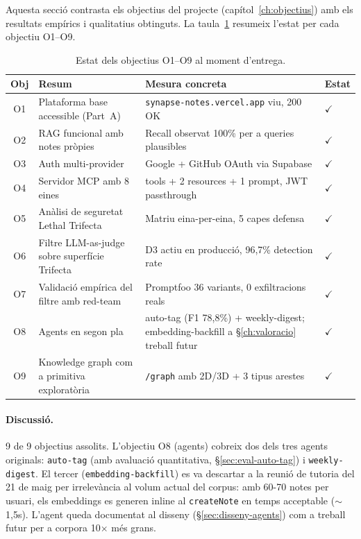 Aquesta secció contrasta els objectius del projecte (capítol~\ref{ch:objectius}) amb els resultats empírics i qualitatius obtinguts. La taula~\ref{tab:objectius-resultats} resumeix l'estat per cada objectiu O1--O9.

\begin{table}[H]
    \centerfloat
    \footnotesize
    \caption{Estat dels objectius O1--O9 al moment d'entrega.}
    \label{tab:objectius-resultats}
    \begin{tabular}{@{}cl>{\raggedright\arraybackslash}p{4.5cm}l@{}}
        \toprule
        Obj & Resum & Mesura concreta & Estat \\
        \midrule
        O1 & Plataforma base accessible (Part~A) & \texttt{synapse-notes.vercel.app} viu, 200 OK & $\checkmark$ \\
        O2 & RAG funcional amb notes pròpies & Recall observat 100\% per a queries plausibles & $\checkmark$ \\
        O3 & Auth multi-provider & Google + GitHub OAuth via Supabase & $\checkmark$ \\
        O4 & Servidor MCP amb 8 eines & 8 tools + 2 resources + 1 prompt, JWT passthrough & $\checkmark$ \\
        O5 & Anàlisi de seguretat Lethal Trifecta & Matriu eina-per-eina, 5 capes defensa & $\checkmark$ \\
        O6 & Filtre LLM-as-judge sobre superfície Trifecta & D3 actiu en producció, 96{,}7\% detection rate & $\checkmark$ \\
        O7 & Validació empírica del filtre amb red-team & Promptfoo 36 variants, 0 exfiltracions reals & $\checkmark$ \\
        O8 & Agents en segon pla & auto-tag (F1 78{,}8\%) + weekly-digest; embedding-backfill a \S\ref{ch:valoracio} treball futur & $\checkmark$ \\
        O9 & Knowledge graph com a primitiva exploratòria & \texttt{/graph} amb 2D/3D + 3 tipus arestes & $\checkmark$ \\
        \bottomrule
    \end{tabular}
\end{table}

\paragraph{Discussió.} 9 de 9 objectius assolits. L'objectiu O8 (agents) cobreix dos dels tres agents originals: \texttt{auto-tag} (amb avaluació quantitativa, \S\ref{sec:eval-auto-tag}) i \texttt{weekly-digest}. El tercer (\texttt{embedding-backfill}) es va descartar a la reunió de tutoria del 21 de maig per irrelevància al volum actual del corpus: amb 60-70 notes per usuari, els embeddings es generen inline al \texttt{createNote} en temps acceptable ($\sim$1{,}5s). L'agent queda documentat al disseny (\S\ref{sec:disseny-agents}) com a treball futur per a corpora 10$\times$ més grans.

